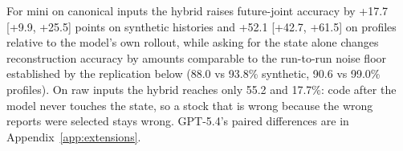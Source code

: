 For mini on canonical inputs the hybrid raises future-joint accuracy by +17.7 [+9.9, +25.5] points on synthetic histories and +52.1 [+42.7, +61.5] on profiles relative to the model's own rollout, while asking for the state alone changes reconstruction accuracy by amounts comparable to the run-to-run noise floor established by the replication below (88.0 vs 93.8\% synthetic, 90.6 vs 99.0\% profiles). On raw inputs the hybrid reaches only 55.2 and 17.7\%: code after the model never touches the state, so a stock that is wrong because the wrong reports were selected stays wrong. GPT-5.4's paired differences are in Appendix~\ref{app:extensions}.
